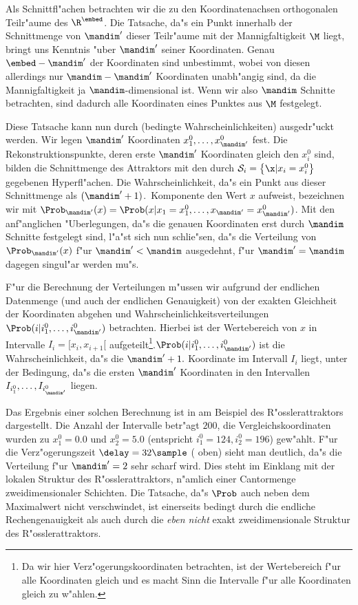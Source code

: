 Als Schnittfl"achen betrachten wir die zu den Koordinatenachsen orthogonalen Teil\-r"aume
des $\R^\embed$. Die Tatsache, da"s ein Punkt innerhalb der Schnittmenge von $\mandim'$
dieser Teil\-r"aume mit der Mannigfaltigkeit $\M$ liegt, bringt uns Kenntnis "uber
$\mandim'$ seiner Koordinaten. Genau $\embed-\mandim'$ der Koordinaten sind unbestimmt,
wobei von diesen allerdings nur $\mandim-\mandim'$ Koordinaten unabh"angig sind, da die
Mannigfaltigkeit ja $\mandim$-dimensional ist. Wenn wir also $\mandim$ Schnitte
betrachten, sind dadurch alle Koordinaten eines Punktes aus $\M$ festgelegt.

Diese Tatsache kann nun durch \begriff(bedingte Wahrscheinlichkeiten) ausgedr"uckt werden.
Wir legen $\mandim'$ Koordinaten $x^0_1,\dots,x^0_{\mandim'}$ fest. Die
Rekonstruktionspunkte, deren erste $\mandim'$ Koordinaten gleich den $x^0_i$ sind, bilden
die Schnittmenge des Attraktors mit den durch $\mathcal{S}_i=\left\{ \x \vert
  x_i=x^0_i\right\}$ gegebenen Hyperfl"achen. Die Wahrscheinlichkeit, da"s ein Punkt aus
dieser Schnittmenge als $(\mandim'+1)$.\  Komponente den Wert $x$ aufweist, bezeichnen wir
mit $\Prob_{\mandim'}(x)=\Prob(x\vert x_1=x^0_1,\dots,x_{\mandim'}=x^0_{\mandim'})$. Mit
den anf"anglichen "Uberlegungen, da"s die genauen Koordinaten erst durch $\mandim$
Schnitte festgelegt sind, l"a"st sich nun schlie"sen, da"s die Verteilung von
$\Prob_{\mandim'}(x)$ f"ur $\mandim'<\mandim$ ausgedehnt, f"ur $\mandim'=\mandim$ dagegen
singul"ar werden mu"s.

F"ur die Berechnung der Verteilungen m"ussen wir aufgrund der endlichen Datenmenge (und
auch der endlichen Genauigkeit) von der exakten Gleichheit der Koordinaten abgehen und
Wahrscheinlichkeitsverteilungen $\Prob(i\vert i^0_1,\dots,i^0_{\mandim'})$ betrachten.
Hierbei ist der Wertebereich von $x$ in Intervalle $I_i=[x_i,x_{i+1}[$
aufgeteilt\footnote{Da wir hier Verz"ogerungskoordinaten betrachten, ist der Wertebereich
  f"ur alle Koordinaten gleich und es macht Sinn die Intervalle f"ur alle Koordinaten
  gleich zu w"ahlen.}.\@ $\Prob(i\vert i^0_1,\dots,i^0_{\mandim'})$ ist die
Wahrscheinlichkeit, da"s die $\mandim'+1.$ Koordinate im Intervall $I_i$ liegt, unter der
Bedingung, da"s die ersten $\mandim'$ Koordinaten in den Intervallen
$I_{i^0_1},\dots,I_{i^0_{\mandim'}}$ liegen.

Das Ergebnis einer solchen Berechnung ist in  am Beispiel des
R"osslerattraktors dargestellt. Die Anzahl der Intervalle betr"agt $200$, die
Vergleichskoordinaten wurden zu $x^0_1=0.0$ und $x^0_2=5.0$ (entspricht $i^0_1=124,
i^0_2=196$) gew"ahlt. F"ur die Verz"ogerungszeit $\delay=32\sample$ ( oben)
sieht man deutlich, da"s die Verteilung f"ur $\mandim'=2$ sehr scharf wird. Dies steht im
Einklang mit der lokalen Struktur des R"osslerattraktors, n"amlich einer Cantormenge
zweidimensionaler Schichten. Die Tatsache, da"s $\Prob$ auch neben dem Maximalwert nicht
verschwindet, ist einerseits bedingt durch die endliche Rechengenauigkeit als auch durch
die \emph{eben nicht} exakt zweidimensionale Struktur des R"osslerattraktors.

